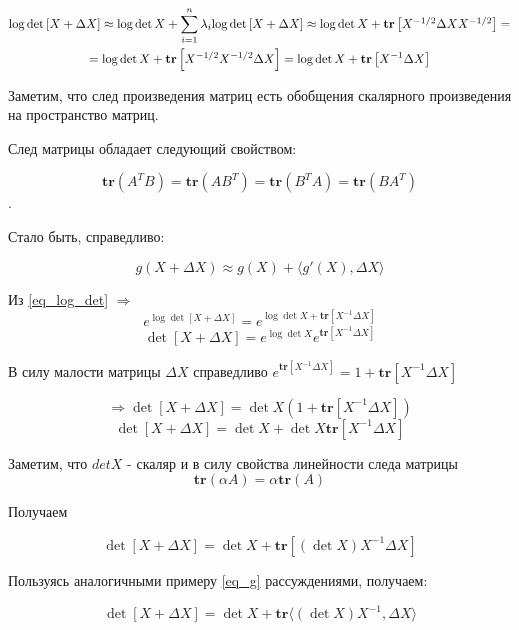 \documentclass[a4paper,12pt]{article}
\newcommand{\lt}{\left}
\newcommand{\rt}{\right}
\newcommand{\al}{\alpha}
\newcommand{\D}{\Delta}
\begin{document}
\begin{multline}\label{eq_log_det}
 \log\det\left[ X+ \Delta X\right] \approx \log\det X + \sum\limits_{i=1}^n \lambda_i$$
 $$\log\det\left[ X+ \Delta X\right] \approx \log\det X + \mathbf{tr}\left[X^{-1/2} \Delta X X^{-1/2}\right] =\\= \log\det X + \mathbf{tr}\left[X^{-1/2} X^{-1/2} \Delta X \right] = \log\det X + \mathbf{tr}\left[X^{-1}\Delta X \right]
 \end{multline}
 
 Заметим, что след произведения матриц есть обобщения скалярного произведения на пространство матриц. 
 
След матрицы обладает следующий свойством:
 
 $$\mathbf{tr}(A^TB) = \mathbf{tr}(AB^T) = \mathbf{tr}(B^TA) = \mathbf{tr}(BA^T)$$. 
 
 Стало быть, справедливо:
 
 \begin{equation}\label{eq_g}
 g(X + \Delta X) \approx g(X) + \langle g'(X), \Delta X \rangle
 \end{equation}
 
 Из \eqref{eq_log_det} $\Rightarrow$ $$e^{\log\det\left[ X+ \Delta X\right]} = e^{\log\det X + \mathbf{tr}\left[X^{-1}\Delta X \right]} $$
 $$\det\left[ X+ \Delta X\right] = e^{\log\det X} e^{\mathbf{tr}\left[X^{-1}\Delta X \right]} $$
 
 В силу малости матрицы $\D X$ справедливо $e^{\mathbf{tr}\left[X^{-1}\Delta X \right]} = 1 + \mathbf{tr}\left[X^{-1}\Delta X \right] $
 
 $$\Rightarrow\det\left[ X+ \Delta X\right] = \det X\lt( 1 + \mathbf{tr}\left[X^{-1}\Delta X \right]\rt)  $$
 \begin{equation}\label{eq_3}
 \det\left[ X+ \Delta X\right] = \det X+ \det X\mathbf{tr}\left[X^{-1}\Delta X \right]
 \end{equation}
 
 Заметим, что $det X$ - скаляр и в силу свойства линейности следа матрицы $$\mathbf{tr}\lt(\al A \rt) = \al \mathbf{tr}\lt(A \rt)$$
 
 Получаем 
 
 $$ \det\left[ X+ \Delta X\right] = \det X+ \mathbf{tr}\left[(\det X) X^{-1}\Delta X \right]$$
 
 Пользуясь аналогичными примеру \eqref{eq_g} рассуждениями, получаем:
 
 $$ \det\left[ X+ \Delta X\right] = \det X+ \mathbf{tr}\langle (\det X) X^{-1}, \Delta X \rangle$$
 
\end{document}
